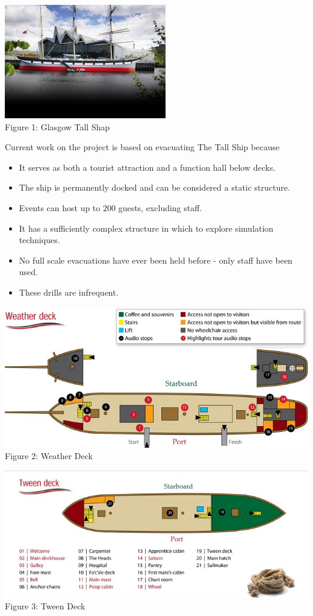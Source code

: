 \begin{center}
\includegraphics{../images/glasgowTallShip.jpg}
\\Figure 1: Glasgow Tall Shap
\end{center}
Current work on the project is based on evacuating The Tall Ship because 
\begin{itemize}
 \item It serves as both a tourist attraction and a function hall below decks.
 \item The ship is permanently docked and can be considered a static structure.
 \item Events can host up to 200 guests, excluding staff.
 \item It has a sufficiently complex structure in which to explore simulation techniques.
 \item No full scale evacuations have ever been held before - only staff have been used.
 \item These drills are infrequent.
\end{itemize}

\begin{center}
\includegraphics[scale=0.4]{../images/weatherdeck.jpg}
\\Figure 2: Weather Deck
\end{center}

\begin{center}
\includegraphics[scale=0.4]{../images/tweendeck.jpg}
\\Figure 3: Tween Deck
\end{center}

